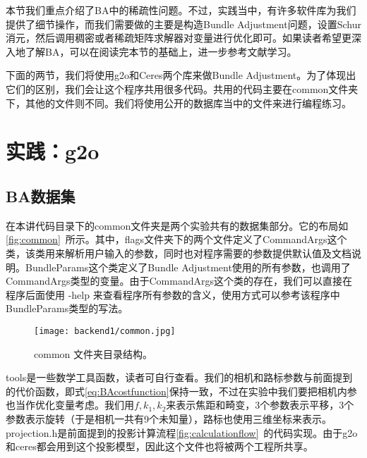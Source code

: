 
本节我们重点介绍了BA中的稀疏性问题。不过，实践当中，有许多软件库为我们提供了细节操作，而我们需要做的主要是构造Bundle Adjustment问题，设置Schur消元，然后调用稠密或者稀疏矩阵求解器对变量进行优化即可。如果读者希望更深入地了解BA，可以在阅读完本节的基础上，进一步参考文献\cite{Triggs2000}学习。

下面的两节，我们将使用g2o和Ceres两个库来做Bundle Adjustment。为了体现出它们的区别，我们会让这个程序共用很多代码。共用的代码主要在common文件夹下，其他的文件则不同。我们将使用公开的数据库\cite{bundleadjustmentinlarge}当中的文件来进行编程练习。
\clearpage

\section{实践：g2o}
\subsection{BA数据集}

在本讲代码目录下的common文件夹是两个实验共有的数据集部分。它的布局如\autoref{fig:common}~所示。其中，flags文件夹下的两个文件定义了CommandArgs这个类，该类用来解析用户输入的参数，同时也对程序需要的参数提供默认值及文档说明。BundleParams这个类定义了Bundle Adjustment使用的所有参数，也调用了CommandArgs类型的变量。由于CommandArgs这个类的存在，我们可以直接在程序后面使用 -help 来查看程序所有参数的含义，使用方式可以参考该程序中BundleParams类型的写法。

\begin{figure}[!htp]
	\centering
	\texttt{[image: backend1/common.jpg]}
	\caption{common 文件夹目录结构。}
	\label{fig:common}
\end{figure}

tools是一些数学工具函数，读者可自行查看。我们的相机和路标参数与前面提到的代价函数，即式\eqref{eq:BAcostfunction}保持一致，不过在实验中我们要把相机内参也当作优化变量考虑。我们用$f,k_1,k_2$来表示焦距和畸变，3个参数表示平移，3个参数表示旋转（于是相机一共有9个未知量），路标也使用三维坐标来表示。projection.h是前面提到的投影计算流程\autoref{fig:calculationflow}~的代码实现。由于g2o和ceres都会用到这个投影模型，因此这个文件也将被两个工程所共享。

